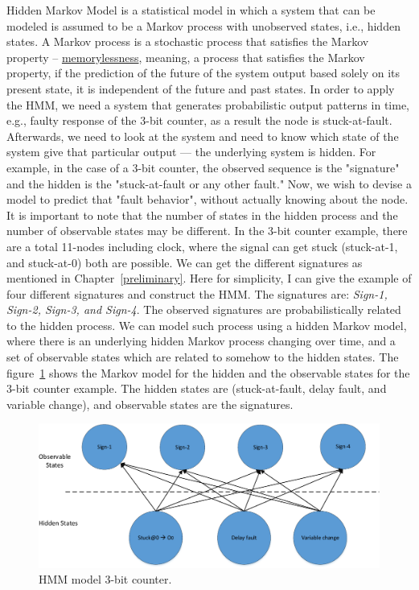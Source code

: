 Hidden Markov Model is a statistical model in which a system that can be modeled is assumed to be a Markov process with unobserved states, i.e., hidden states. A Markov process  is a stochastic process that satisfies the Markov property -- \underline{memorylessness}, meaning, a process that satisfies the Markov property, if the prediction of the future of the system output based solely on its present state, it is independent of the future and past states. In order to apply the HMM, we need a system that generates probabilistic output patterns in time, e.g., faulty response of the 3-bit counter, as a result the node is stuck-at-fault. Afterwards, we need to look at the system and need to know which state of the system give that particular output ---  the underlying system is hidden. For example, in the case of a 3-bit counter, the observed sequence is the "signature" and the hidden is the "stuck-at-fault or any other fault." Now, we wish to devise a model to predict that "fault behavior", without actually knowing about the node. It is important to note that the number of states in the hidden process and the number of observable states may be different. 
In the 3-bit counter example, there are a total 11-nodes including clock, where the signal can get stuck (stuck-at-1, and stuck-at-0) both are possible. We can get the  different signatures as mentioned in Chapter~\ref{preliminary}. Here for simplicity, I can give the example of four different signatures and construct the HMM. The signatures are: \textit{Sign-1, Sign-2, Sign-3, and Sign-4}. The observed signatures are probabilistically related to the hidden process. We can model such process using a hidden Markov model, where there is an underlying hidden Markov process changing over time, and a set of observable states which are related to somehow to the hidden states.
The figure~\ref{fig:HMM-3-bit} shows the Markov model for the hidden and the observable states for the 3-bit counter example. The hidden states are (stuck-at-fault, delay fault, and variable change), and observable states are  the signatures. 
\begin{figure}[tb!]
 \centering
  \captionsetup{justification=centering}    
   \includegraphics[scale=0.8]{Figures/HMM.pdf}
   \caption{HMM model 3-bit counter.}
\label{fig:HMM-3-bit}
\end{figure}

